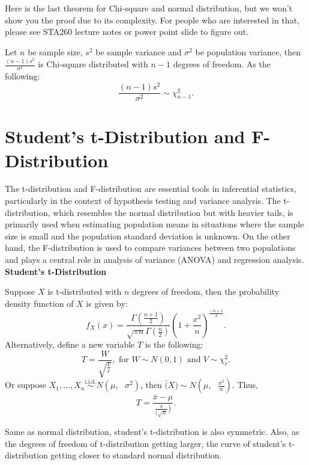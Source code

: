 \noindent
Here is the last theorem for Chi-square and normal distribution, but we won't show you the proof due to its complexity. For people who are interested in that, please see STA260 lecture notes or power point slide to figure out.

\begin{theorem}
Let $n$ be sample size, $s^2$ be sample variance and $\sigma^2$ be population variance, then $\frac{(n-1)s^2}{\sigma^2}$ is Chi-square distributed with $n - 1$ degrees of freedom. As the following: \[ \frac{(n-1)s^2}{\sigma^2} \sim \chi_{n-1}^{2}.\]
\end{theorem}

\section{Student's t-Distribution and F-Distribution}

The t-distribution and F-distribution are essential tools in inferential statistics, particularly in the context of hypothesis testing and variance analysis. The t-distribution, which resembles the normal distribution but with heavier tails, is primarily used when estimating population means in situations where the sample size is small and the population standard deviation is unknown. On the other hand, the F-distribution is used to compare variances between two populations and plays a central role in analysis of variance (ANOVA) and regression analysis.\\

\noindent
\textbf{Student's t-Distribution}

\begin{definition}
Suppose $X$ is t-distributed with $n$ degrees of freedom, then the probability density function of $X$ is given by: \[ f_{X}(x) = \frac{\Gamma(\frac{n+1}{2})}{\sqrt{\pi n} \Gamma(\frac{n}{2})} (1+\frac{x^2}{n})^{\frac{-n+1}{2}}.\]
Alternatively, define a new variable $T$ is the following: \[ T = \frac{W}{\sqrt{\frac{V}{r}}}, \text{ for $W \sim N(0, 1)  \text{ and } V \sim \chi_{r}^{2}$.}\]
Or suppose $X_1, ..., X_n \overset{\text{i.i.d.}}{\sim} N(\mu, \text{ } \sigma^2)$, then $\bar(X) \sim N(\mu, \text{ } \frac{\sigma^2}{n})$. Thus, \[ T = \frac{ \bar{x} - \mu}{\frac{s}{(\sqrt{n}})}.\]
\end{definition}

\noindent
Same as normal distribution, student's t-distribution is also symmetric. Also, as the degrees of freedom of t-distribution getting larger, the curve of student's t-distribution getting closer to standard normal distribution.\\

